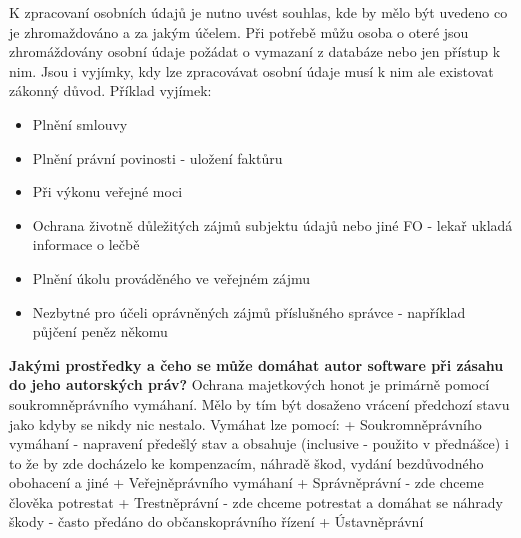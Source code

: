 \documentclass[12pt,a4paper,czech]{report}
\newcommand{\nadpis}[1]{\noindent\textbf{\Large{#1}}\normalsize}
\begin{document}
K zpracovaní osobních údajů je nutno uvést souhlas, kde by mělo být uvedeno co je zhromaždováno a za jakým účelem. Při potřebě můžu osoba o oteré jsou zhromáždovány osobní údaje požádat o vymazaní z databáze nebo jen přístup k nim. Jsou i vyjímky, kdy lze zpracovávat osobní údaje musí k nim ale existovat zákonný důvod.
Příklad vyjímek:
\begin{itemize}
    \item Plnění smlouvy
    \item Plnění právní povinosti - uložení faktůru
    \item Při výkonu veřejné moci
    \item Ochrana životně důležitých zájmů subjektu údajů nebo jiné FO - lekař ukladá informace o lečbě
    \item Plnění úkolu prováděného ve veřejném zájmu
    \item Nezbytné pro účeli oprávněných zájmů příslušného správce - například půjčení peněz někomu 
\end{itemize}
\newline
\newline
\nadpis{Jakými prostředky a čeho se může domáhat autor software při zásahu do jeho autorských práv?}
\newline
\newline
Ochrana majetkových honot je primárně pomocí soukromněprávního vymáhaní. Mělo by tím být dosaženo vrácení předchozí stavu jako kdyby se nikdy nic nestalo. 
Vymáhat lze pomocí:
+ Soukromněprávního vymáhaní - napravení předešlý stav a obsahuje (inclusive - použito v přednášce) i to že by zde docházelo ke kompenzacím, náhradě škod, vydání bezdůvodného obohacení a jiné
+ Veřejněprávního vymáhaní
  + Správněprávní - zde chceme člověka potrestat 
  + Trestněprávní - zde chceme potrestat a domáhat se náhrady škody - často předáno do občanskoprávního řízení
  + Ústavněprávní
  
\end{document}
